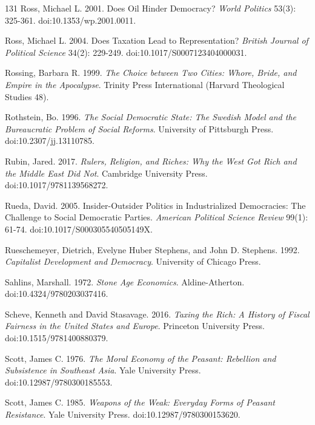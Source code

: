 \documentclass[11pt,letterpaper]{article}
\theoremstyle{definition}
\theoremstyle{remark}
\begin{document}
\begin{thebibliography}{131}
Ross, Michael L. 2001. Does Oil Hinder Democracy? \emph{World Politics} 53(3): 325-361. doi:10.1353/wp.2001.0011.

Ross, Michael L. 2004. Does Taxation Lead to Representation? \emph{British Journal of Political Science} 34(2): 229-249. doi:10.1017/S0007123404000031.

Rossing, Barbara R. 1999. \emph{The Choice between Two Cities: Whore, Bride, and Empire in the Apocalypse}. Trinity Press International (Harvard Theological Studies 48).

Rothstein, Bo. 1996. \emph{The Social Democratic State: The Swedish Model and the Bureaucratic Problem of Social Reforms}. University of Pittsburgh Press. doi:10.2307/jj.13110785.

Rubin, Jared. 2017. \emph{Rulers, Religion, and Riches: Why the West Got Rich and the Middle East Did Not}. Cambridge University Press. doi:10.1017/9781139568272.

Rueda, David. 2005. Insider-Outsider Politics in Industrialized Democracies: The Challenge to Social Democratic Parties. \emph{American Political Science Review} 99(1): 61-74. doi:10.1017/S000305540505149X.

Rueschemeyer, Dietrich, Evelyne Huber Stephens, and John D. Stephens. 1992. \emph{Capitalist Development and Democracy}. University of Chicago Press.

Sahlins, Marshall. 1972. \emph{Stone Age Economics}. Aldine-Atherton. doi:10.4324/9780203037416.

Scheve, Kenneth and David Stasavage. 2016. \emph{Taxing the Rich: A History of Fiscal Fairness in the United States and Europe}. Princeton University Press. doi:10.1515/9781400880379.

Scott, James C. 1976. \emph{The Moral Economy of the Peasant: Rebellion and Subsistence in Southeast Asia}. Yale University Press. doi:10.12987/9780300185553.

Scott, James C. 1985. \emph{Weapons of the Weak: Everyday Forms of Peasant Resistance}. Yale University Press. doi:10.12987/9780300153620.


\end{thebibliography}
\end{document}
